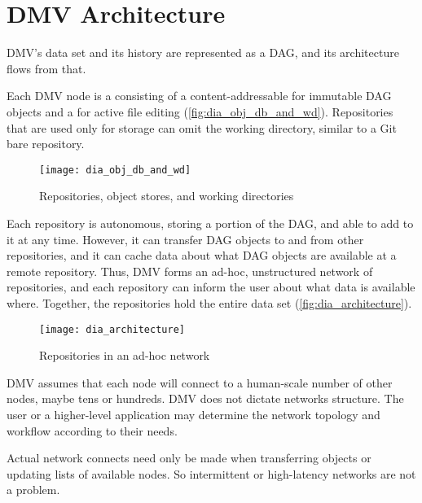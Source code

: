 \chapter{DMV Architecture}

DMV's data set and its history are represented as a DAG, and its architecture
flows from that.

Each DMV node is a  consisting of a content-addressable
 for immutable DAG objects and a  for active file editing (\autoref{fig:dia_obj_db_and_wd}).
Repositories that are used only for storage can omit the working directory,
similar to a Git bare repository.

\begin{figure}[h]
  \caption{Repositories, object stores, and working directories}
  \label{fig:dia_obj_db_and_wd}
  \centering
    \texttt{[image: dia\_obj\_db\_and\_wd]}
\end{figure}

Each repository is autonomous, storing a portion of the DAG, and able to add to
it at any time. However, it can transfer DAG objects to and from other
repositories, and it can cache data about what DAG objects are available at a
remote repository. Thus, DMV forms an ad-hoc, unstructured network of
repositories, and each repository can inform the user about what data is
available where. Together, the repositories hold the entire data set
(\autoref{fig:dia_architecture}).

\begin{figure}[h]
  \caption{Repositories in an ad-hoc network}
  \label{fig:dia_architecture}
  \centering
    \texttt{[image: dia\_architecture]}
\end{figure}

DMV assumes that each node will connect to a human-scale number of other nodes,
maybe tens or hundreds. DMV does not dictate networks structure. The user or a
higher-level application may determine the network topology and workflow
according to their needs.

Actual network connects need only be made when transferring objects or updating
lists of available nodes. So intermittent or high-latency networks are not a
problem.
